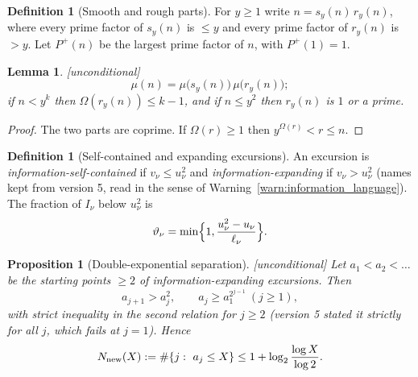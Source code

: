\documentclass[11pt]{amsart}
\numberwithin{equation}{section}
\theoremstyle{plain}
\newtheorem{proposition}[theorem]{Proposition}
\newtheorem{lemma}[theorem]{Lemma}
\theoremstyle{definition}
\newtheorem{definition}[theorem]{Definition}
\theoremstyle{remark}
\newcommand{\Pp}{P^{+}}
\begin{document}
\begin{definition}[Smooth and rough parts]
\label{def:smooth_rough}
For $y\ge1$ write $n=s_y(n)\,r_y(n)$, where every prime factor of $s_y(n)$
is $\le y$ and every prime factor of $r_y(n)$ is $>y$. Let $\Pp(n)$ be the
largest prime factor of $n$, with $\Pp(1)=1$.
\end{definition}

\begin{lemma}
\label{lem:rough_part}
\emph{[unconditional]}
\begin{equation}
\label{eq:mu_split}
  \mu(n)=\mu\bigl(s_y(n)\bigr)\,\mu\bigl(r_y(n)\bigr);
\end{equation}
if $n<y^k$ then $\Omega(r_y(n))\le k-1$, and if $n\le y^2$ then $r_y(n)$ is
$1$ or a prime.
\end{lemma}

\begin{proof}
The two parts are coprime. If $\Omega(r)\ge1$ then $y^{\Omega(r)}<r\le n$.
\end{proof}

\begin{definition}[Self-contained and expanding excursions]
\label{def:info-excursion}
An excursion is \emph{information-self-contained} if $v_\nu\le u_\nu^2$ and
\emph{information-expanding} if $v_\nu>u_\nu^2$ (names kept from version 5,
read in the sense of Warning~\ref{warn:information_language}). The fraction
of $I_\nu$ below $u_\nu^2$ is
\begin{equation}
\label{eq:known-fraction}
  \vartheta_\nu=\min\Bigl\{1,\frac{u_\nu^2-u_\nu}{\ell_\nu}\Bigr\}.
\end{equation}
\end{definition}

\begin{proposition}[Double-exponential separation]
\label{prop:double-exp}
\emph{[unconditional]} Let $a_1<a_2<\dots$ be the starting points $\ge2$ of
information-expanding excursions. Then
\begin{equation}
\label{eq:double-exp-separation}
  a_{j+1}>a_j^2,\qquad a_j\ge a_1^{2^{j-1}}\ (j\ge1),
\end{equation}
with strict inequality in the second relation for $j\ge2$ (version 5 stated
it strictly for all $j$, which fails at $j=1$). Hence
\begin{equation}
\label{eq:loglog-exception-count}
  N_{\rm new}(X):=\#\{j:\ a_j\le X\}\le1+\log_2\frac{\log X}{\log2}.
\end{equation}
\end{proposition}
\end{document}
